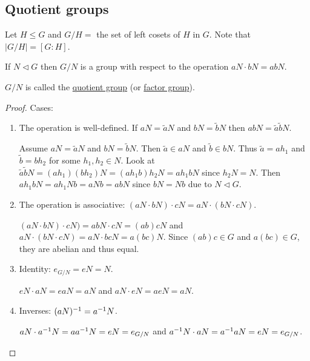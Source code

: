 \documentclass[]{article}
\begin{document}
\subsection{Quotient groups}

Let $H\leq G$ and $G / H =$ the set of left cosets of $H$ in $G$. Note that $|G/H|=[G:H]$.

\begin{theorem}
	If $N\triangleleft G$ then $G/N$ is a group with respect to the operation $aN\cdot bN = abN$.
\end{theorem}
\begin{definition}
	$G/N$ is called the \ul{quotient group} (or \ul{factor group}).
\end{definition}
\begin{proof}
	Cases:
	\begin{enumerate}
		\item The operation is well-defined. If $aN = \tilde aN$ and $bN = \tilde bN$ then $abN = \tilde a\tilde bN$.

			Assume $aN = \tilde aN$ and $bN = \tilde bN$. Then $\tilde a\in aN$ and $\tilde b\in bN$. Thus $\tilde a = ah_1$ and $\tilde b = bh_2$ for some $h_1,h_2\in N$.
			Look at $\tilde a\tilde bN = (ah_1)(bh_2)N = (ah_1 b)h_2 N = ah_1bN$ since $h_2N = N$. Then $ah_1bN = ah_1Nb = aNb = abN$ since $bN = Nb$ due to $N\triangleleft G$.

		\item The operation is associative: $(aN\cdot bN)\cdot cN = aN\cdot(bN\cdot cN)$.

			$(aN\cdot bN)\cdot cN) = abN\cdot cN = (ab)cN$ and $aN\cdot(bN\cdot cN) = aN\cdot bcN = a(bc)N$. Since $(ab)c\in G$ and $a(bc)\in G$, they are abelian and thus equal.

		\item Identity: $e_{G/N} = eN = N$.

			$eN\cdot aN = eaN = aN$ and $aN\cdot eN = aeN = aN$.

		\item Inverses: $(aN)^{-1} = a^{-1} N$.

			$aN\cdot a^{-1} N = aa^{-1} N = eN = e_{G/N}$ and $a^{-1} N\cdot aN = a^{-1} aN = eN = e_{G/N}$.
	\end{enumerate}
\end{proof}
\end{document}

